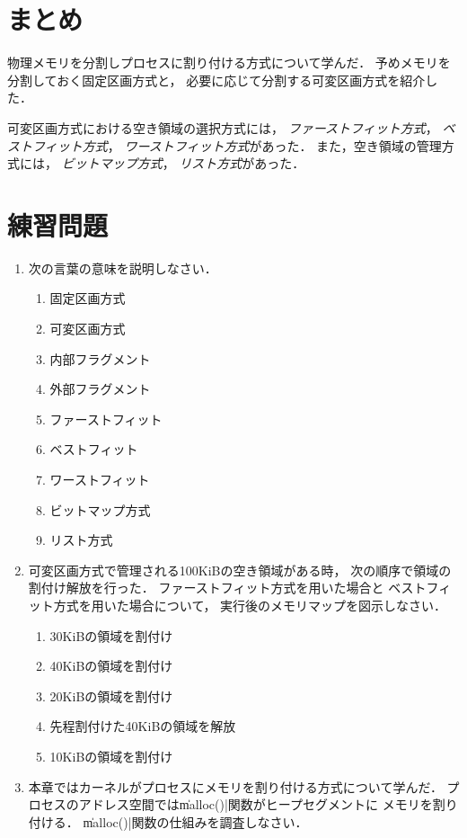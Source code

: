 \section{まとめ}
物理メモリを分割しプロセスに割り付ける方式について学んだ．
予めメモリを分割しておく固定区画方式と，
必要に応じて分割する可変区画方式を紹介した．

可変区画方式における空き領域の選択方式には，
\emph{ファーストフィット方式}，
\emph{ベストフィット方式}，
\emph{ワーストフィット方式}があった．
また，空き領域の管理方式には，
\emph{ビットマップ方式}，
\emph{リスト方式}があった．

\section*{練習問題}
\begin{enumerate}
  \renewcommand{\labelenumi}{\ttfamily\arabic{chapter}.\arabic{enumi}}
  \setlength{\leftskip}{1em}
\item 次の言葉の意味を説明しなさい．
  \begin{enumerate}
  \item 固定区画方式
  \item 可変区画方式
  \item 内部フラグメント
  \item 外部フラグメント
  \item ファーストフィット
  \item ベストフィット
  \item ワーストフィット
  \item ビットマップ方式
  \item リスト方式
  \end{enumerate}
\item 可変区画方式で管理される100KiBの空き領域がある時，
  次の順序で領域の割付け解放を行った．
  ファーストフィット方式を用いた場合と
  ベストフィット方式を用いた場合について，
  実行後のメモリマップを図示しなさい．
  \begin{enumerate}
  \item 30KiBの領域を割付け
  \item 40KiBの領域を割付け
  \item 20KiBの領域を割付け
  \item 先程割付けた40KiBの領域を解放
  \item 10KiBの領域を割付け
  \end{enumerate}
\item 本章ではカーネルがプロセスにメモリを割り付ける方式について学んだ．
  プロセスのアドレス空間では\|malloc()|関数がヒープセグメントに
  メモリを割り付ける．
  \|malloc()|関数の仕組みを調査しなさい．
\end{enumerate}
